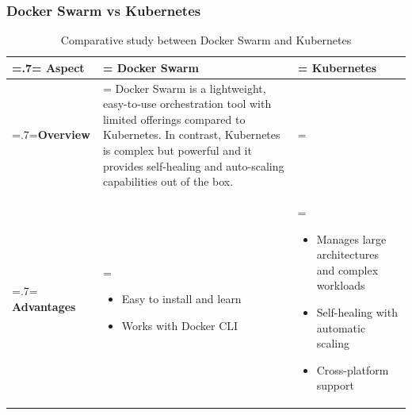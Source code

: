 \subsubsection*{Docker Swarm vs Kubernetes}
\begin{table}[H]
    \renewcommand{\arraystretch}{1.5}
    \caption{Comparative study between Docker Swarm and Kubernetes}
    \centering
    \medskip
    \begin{tabularx}{1\textwidth} {
            | >{\hsize=.7\hsize\linewidth=\hsize\centering\arraybackslash}X
            | >{\hsize=1.15\hsize\linewidth=\hsize\justifying\arraybackslash}X
            | >{\hsize=1.15\hsize\linewidth=\hsize\justifying\arraybackslash}X |}
        \hline
        \rowcolor{primary} \textbf {Aspect} & \textbf{Docker Swarm}                                                                                                                                                                                                                                                              & \textbf{Kubernetes}                                             \\
        \hline
        \textbf {Overview}                  & \multicolumn{2}{|>{\hsize=2.35\hsize}X|} {Docker Swarm is a lightweight, easy-to-use orchestration tool with limited offerings compared to Kubernetes. In contrast, Kubernetes is complex but powerful and it provides self-healing and auto-scaling capabilities out of the box.}                                                                   \\
        \hline
        \textbf {Advantages}                & \begin{itemize}[leftmargin=*, topsep=0pt, itemsep=1pt, parsep=2pt]
            \item Easy to install and learn
            \item Works with Docker CLI
        \end{itemize}                                                                                                                                                                                                                                                      & \begin{itemize}[leftmargin=*, topsep=0pt, itemsep=1pt, parsep=2pt]
            \item Manages large architectures and complex workloads
            \item Self-healing with automatic scaling
            \item Cross-platform support

\end{itemize}
\end{tabularx}
\end{table}
